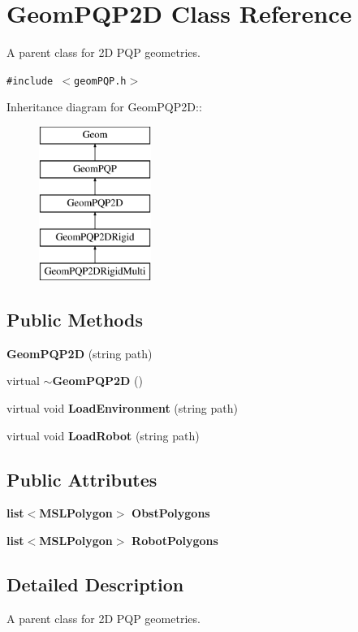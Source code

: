 \section{Geom\-PQP2D  Class Reference}
\label{classGeomPQP2D}
A parent class for 2D PQP geometries. 


{\tt \#include $<$geom\-PQP.h$>$}

Inheritance diagram for Geom\-PQP2D::\begin{figure}[H]
\begin{center}
\leavevmode
\includegraphics[height=5cm]{classGeomPQP2D}
\end{center}
\end{figure}
\subsection*{Public Methods}
\begin{CompactItemize}
\item 
{\bf Geom\-PQP2D} (string path)
\item 
virtual {\bf $\sim$Geom\-PQP2D} ()
\item 
virtual void {\bf Load\-Environment} (string path)
\item 
virtual void {\bf Load\-Robot} (string path)
\end{CompactItemize}
\subsection*{Public Attributes}
\begin{CompactItemize}
\item 
{\bf list}$<${\bf MSLPolygon}$>$ {\bf Obst\-Polygons}
\item 
{\bf list}$<${\bf MSLPolygon}$>$ {\bf Robot\-Polygons}
\end{CompactItemize}


\subsection{Detailed Description}
A parent class for 2D PQP geometries.



